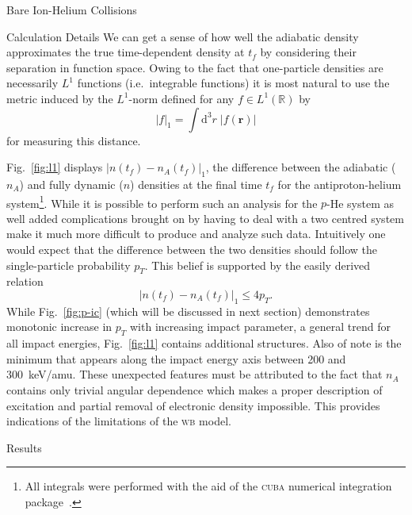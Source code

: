 \documentclass[letterpaper, 11 pt]{report}
\begin{document}
\begin{chapter}{Bare Ion-Helium Collisions \label{chap:p-he2p-he}}
\begin{section}{Calculation Details \label{sec:phe2p-det}}
      We can get a sense of how well the adiabatic density approximates the true time-dependent density
      at $t_f$ by considering their separation in function space. Owing to the fact that one-particle
      densities are necessarily $L^1$ functions (i.e.\ integrable functions) it is most natural to use
      the metric induced by the $L^1$-norm defined for any
      $f \in L^1\left(\mathbb{R}\right)$ by
      \begin{equation} \label{eq:l1rorm}
         \left| f \right|_1 = \int \mathrm{d}^3 r \; \left| f(\mathbf{r}) \right|
      \end{equation}
      for measuring this distance.

      Fig.~\ref{fig:l1} displays $\left| n(t_f) - n_A(t_f) \right|_1$, the difference between the
      adiabatic ($n_A$) and fully dynamic ($n$) densities at the final time $t_f$ for the
      antiproton-helium system\footnote{All integrals were performed with the aid of the \textsc{cuba}
      numerical integration package~\cite{cuba}.}. While it is possible to perform such an analysis for
      the $p$-He system as well added complications brought on by having to deal with a two centred
      system make it much more difficult to produce and analyze such data. Intuitively one would expect
      that the difference between the two densities should follow the single-particle probability $p_T$.
      This belief is supported by the easily derived relation
      \begin{equation} \label{eq:diff-bound}
         \left| n(t_f) - n_A(t_f) \right|_1 \leq 4 p_T.
      \end{equation}
      While Fig.~\ref{fig:p-ic} (which will be discussed in next section) demonstrates monotonic
      increase in $p_T$ with increasing impact parameter, a general trend for all impact energies,
      Fig.~\ref{fig:l1} contains additional structures. Also of note is the minimum that appears along
      the impact energy axis between 200 and 300~keV/amu. These unexpected features must be attributed
      to the fact that $n_A$ contains only trivial angular dependence which makes a proper description
      of excitation and partial removal of electronic density impossible. This provides indications of
      the limitations of the \textsc{wb} model.

   \end{section}

   \begin{section}{Results \label{sec:phe2p-res}}


\end{section}
\end{chapter}
\end{document}

